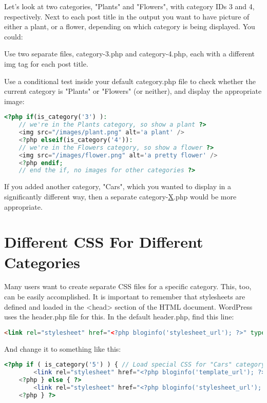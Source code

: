 Let's look at two categories, "Plants" and "Flowers", with category IDs 3 and 4, respectively. Next to each post title in the output you want to have picture of either a plant, or a flower, depending on which category is being displayed. You could:
\begin{compactitem}
\item Use two separate files, category-3.php and category-4.php, each with a different img tag for each post title.
\item Use a conditional test inside your default category.php file to check whether the current category is "Plants" or "Flowers" (or neither), and display the appropriate image:

\begin{lstlisting}[language=PHP]
	<?php if(is_category('3') ): 
	// we're in the Plants category, so show a plant ?>
	<img src="/images/plant.png" alt='a plant' />
	<?php elseif(is_category('4')):
	// we're in the Flowers category, so show a flower ?>
	<img src="/images/flower.png" alt='a pretty flower' />
	<?php endif; 
	// end the if, no images for other categories ?>
\end{lstlisting}
\end{compactitem}

If you added another category, "Cars", which you wanted to display in a significantly different way, then a separate category-\underline{X}.php would be more appropriate.

\section{Different CSS For Different Categories}


Many users want to create separate CSS files for a specific category. This, too, can be easily accomplished. It is important to remember that stylesheets are defined and loaded in the <head> section of the HTML document. WordPress uses the header.php file for this. In the default header.php, find this line:

\begin{lstlisting}[language=HTML]
	<link rel="stylesheet" href="<?php bloginfo('stylesheet_url'); ?>" type="text/css" media="screen" />
\end{lstlisting}

And change it to something like this:

\begin{lstlisting}[language=PHP]
	<?php if ( is_category('5') ) { // Load special CSS for "Cars" category ?>
		<link rel="stylesheet" href="<?php bloginfo('template_url'); ?>/category-5.css" type="text/css" media="screen" />;
	<?php } else { ?>
		<link rel="stylesheet" href="<?php bloginfo('stylesheet_url'); ?>" type="text/css" media="screen" />
	<?php } ?>
\end{lstlisting}

